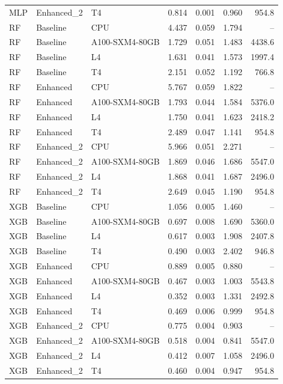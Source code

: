 \begin{table}
\begin{tabular}{lllrrrr}
MLP & Enhanced\_2 & T4 & 0.814 & 0.001 & 0.960 & 954.8 \\
RF & Baseline & CPU & 4.437 & 0.059 & 1.794 & -- \\
RF & Baseline & A100-SXM4-80GB & 1.729 & 0.051 & 1.483 & 4438.6 \\
RF & Baseline & L4 & 1.631 & 0.041 & 1.573 & 1997.4 \\
RF & Baseline & T4 & 2.151 & 0.052 & 1.192 & 766.8 \\
RF & Enhanced & CPU & 5.767 & 0.059 & 1.822 & -- \\
RF & Enhanced & A100-SXM4-80GB & 1.793 & 0.044 & 1.584 & 5376.0 \\
RF & Enhanced & L4 & 1.750 & 0.041 & 1.623 & 2418.2 \\
RF & Enhanced & T4 & 2.489 & 0.047 & 1.141 & 954.8 \\
RF & Enhanced\_2 & CPU & 5.966 & 0.051 & 2.271 & -- \\
RF & Enhanced\_2 & A100-SXM4-80GB & 1.869 & 0.046 & 1.686 & 5547.0 \\
RF & Enhanced\_2 & L4 & 1.868 & 0.041 & 1.687 & 2496.0 \\
RF & Enhanced\_2 & T4 & 2.649 & 0.045 & 1.190 & 954.8 \\
XGB & Baseline & CPU & 1.056 & 0.005 & 1.460 & -- \\
XGB & Baseline & A100-SXM4-80GB & 0.697 & 0.008 & 1.690 & 5360.0 \\
XGB & Baseline & L4 & 0.617 & 0.003 & 1.908 & 2407.8 \\
XGB & Baseline & T4 & 0.490 & 0.003 & 2.402 & 946.8 \\
XGB & Enhanced & CPU & 0.889 & 0.005 & 0.880 & -- \\
XGB & Enhanced & A100-SXM4-80GB & 0.467 & 0.003 & 1.003 & 5543.8 \\
XGB & Enhanced & L4 & 0.352 & 0.003 & 1.331 & 2492.8 \\
XGB & Enhanced & T4 & 0.469 & 0.006 & 0.999 & 954.8 \\
XGB & Enhanced\_2 & CPU & 0.775 & 0.004 & 0.903 & -- \\
XGB & Enhanced\_2 & A100-SXM4-80GB & 0.518 & 0.004 & 0.841 & 5547.0 \\
XGB & Enhanced\_2 & L4 & 0.412 & 0.007 & 1.058 & 2496.0 \\
XGB & Enhanced\_2 & T4 & 0.460 & 0.004 & 0.947 & 954.8 \\
\bottomrule
\end{tabular}
\end{table}
